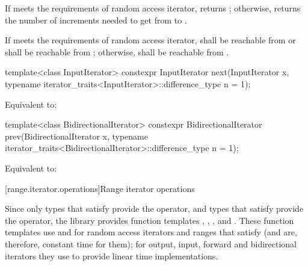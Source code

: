 \begin{itemdescr}
\pnum
\effects
If  meets the requirements of random access iterator,
returns ; otherwise, returns
the number of increments needed to get from
to
.

\pnum
\requires
If  meets the requirements of random access iterator,
 shall be reachable from  or  shall be
reachable from ; otherwise,
shall be reachable from
.
\end{itemdescr}

%
\begin{itemdecl}
template<class InputIterator>
  constexpr InputIterator next(InputIterator x,
    typename iterator_traits<InputIterator>::difference_type n = 1);
\end{itemdecl}

\begin{itemdescr}
\pnum
\effects Equivalent to: 
\end{itemdescr}

%
\begin{itemdecl}
template<class BidirectionalIterator>
  constexpr BidirectionalIterator prev(BidirectionalIterator x,
    typename iterator_traits<BidirectionalIterator>::difference_type n = 1);
\end{itemdecl}

\begin{itemdescr}
\pnum
\effects Equivalent to: 
\end{itemdescr}








[range.iterator.operations]{Range iterator operations}

\pnum
Since only types that satisfy
 provide the \tcode{+} operator, and
types that satisfy  provide the \tcode{-}
operator, the library provides function templates
, , , and .
These
function templates
use
\tcode{+}
and
\tcode{-}
for random access iterators and ranges that satisfy  (and are,
therefore, constant time for them); for output, input, forward and bidirectional
iterators they use
\tcode{++}
to provide linear time
implementations.


